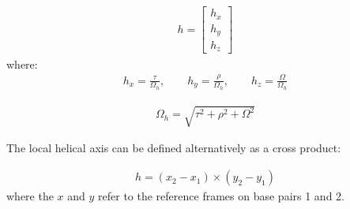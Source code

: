 \begin{gather}
\label{eq:helaxis}  
h=\left[ \begin{array}{c}
h_x\\
h_y\\
h_z
\end{array} \right]
\end{gather}
where:
\begin{gather}
h_x = \frac{\tau}{\Omega_h}, \qquad h_y = \frac{\rho}{\Omega_h},
\qquad h_z = \frac{\Omega}{\Omega_h}
\end{gather}

\begin{gather}
\Omega_h = \sqrt{\tau^2 + \rho^2 + \Omega^2}
\end{gather}

The local helical axis can be defined alternatively \cite{bansal1995}
as a cross product:

\begin{gather}
h = (x_2 - x_1) \times (y_2 - y_1)
\end{gather}
where the  $x$ and $y$ refer to  the reference frames on  base pairs 1
and 2.






